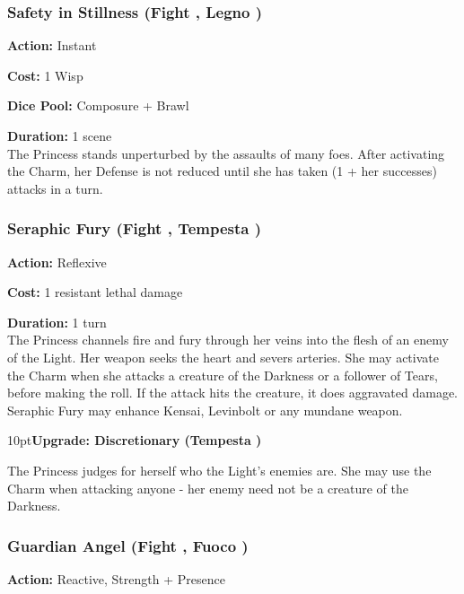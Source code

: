 \subsubsection*{Safety in Stillness (Fight \textbullet\textbullet, Legno \textbullet)}

\noindent \textbf{Action:} Instant

\noindent \textbf{Cost:} 1 Wisp

\noindent \textbf{Dice Pool:}  Composure + Brawl

\noindent \textbf{Duration:} 1 scene\\

\noindent The Princess stands unperturbed by the assaults of many foes. After activating the Charm, her Defense is not reduced until she has taken (1 + her successes) attacks in a turn.

\subsubsection*{Seraphic Fury (Fight \textbullet\textbullet, Tempesta \textbullet\textbullet)}

\noindent \textbf{Action:} Reflexive

\noindent \textbf{Cost:} 1 resistant lethal damage

\noindent \textbf{Duration:} 1 turn\\

The Princess channels fire and fury through her veins into the flesh of an enemy of the Light. Her weapon seeks the heart and severs arteries. She may activate the Charm when she attacks a creature of the Darkness or a follower of Tears, before making the roll. If the attack hits the creature, it does aggravated damage. Seraphic Fury may enhance Kensai, Levinbolt or any mundane weapon.

\begin{myindentpar}{10pt}\textbf{Upgrade: Discretionary (Tempesta \textbullet\textbullet\textbullet\textbullet)}

The Princess judges for herself who the Light’s enemies are. She may use the Charm when attacking anyone - her enemy need not be a creature of the Darkness.\end{myindentpar}

\subsubsection*{Guardian Angel (Fight \textbullet\textbullet, Fuoco \textbullet)}
\noindent \textbf{Action:} Reactive, Strength + Presence\\

